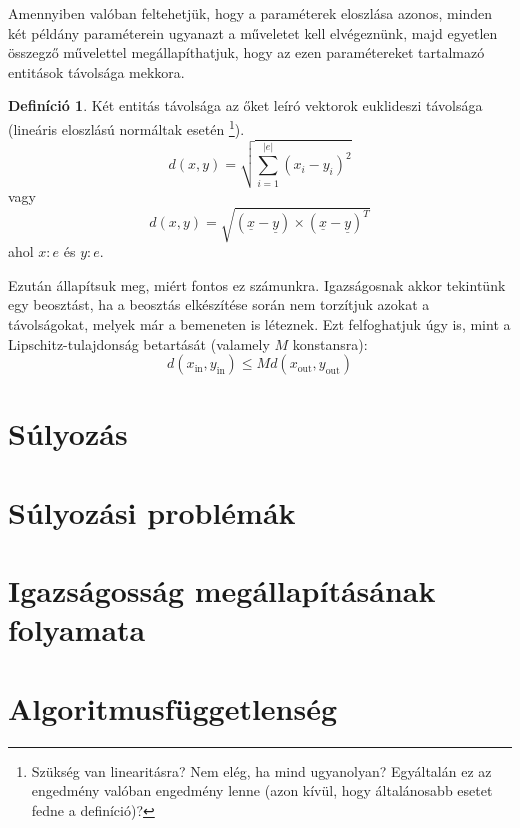 \documentclass{article}
\theoremstyle{definition}
\newtheorem{definition}{Definíció}[section]
\newcommand{\subin}[1]{ {#1}_{\text{in}} }
\newcommand{\subout}[1]{ {#1}_{\text{out}} }
\newcommand{\vect}[1]{ \underline{#1} }
\begin{document}
\begin{multicols}{2}
    Amennyiben valóban feltehetjük, hogy a paraméterek eloszlása azonos, minden két példány paraméterein ugyanazt a műveletet kell elvégeznünk, majd egyetlen összegző művelettel megállapíthatjuk, hogy az ezen paramétereket tartalmazó entitások távolsága mekkora. 
    
    \begin{definition}
        Két entitás távolsága az őket leíró vektorok euklideszi távolsága (lineáris eloszlású normáltak esetén \footnote{Szükség van linearitásra? Nem elég, ha mind ugyanolyan? Egyáltalán ez az engedmény valóban engedmény lenne (azon kívül, hogy általánosabb esetet fedne a definíció)?}).
        \begin{equation}
            d(x, y) = \sqrt{\sum_{i=1}^{|e|} (x_i - y_i)^2 } 
        \end{equation}
        vagy
        \begin{equation}
            d(x, y) = \sqrt{(\vect{x}-\vect{y}) \times (\vect{x}-\vect{y})^T}
        \end{equation}
        ahol $x:e$ és $y:e$.
    \end{definition}
    
    Ezután állapítsuk meg, miért fontos ez számunkra. Igazságosnak akkor tekintünk egy beosztást, ha a beosztás elkészítése során nem torzítjuk azokat a távolságokat, melyek már a bemeneten is léteznek. Ezt felfoghatjuk úgy is, mint a Lipschitz-tulajdonság betartását (valamely $M$ konstansra):
    \begin{equation}
        d(\subin{x}, \subin{y}) \leq Md(\subout{x}, \subout{y})
    \end{equation}
    
    
    

\section{Súlyozás}

\section{Súlyozási problémák}

\section{Igazságosság megállapításának folyamata}

\section{Algoritmusfüggetlenség}
    
\end{multicols}
    
\end{document}
